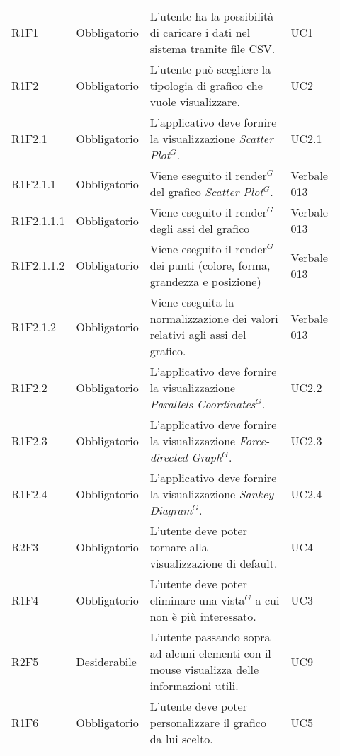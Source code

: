 {\begin{longtable}{p{0.12\linewidth}p{0.15\linewidth}p{0.50\linewidth}p{0.15\linewidth}}
    \rowcolor[RGB]{216, 235, 171}
    R1F1 & Obbligatorio & L'utente ha la possibilità di caricare i dati nel sistema tramite file CSV. & UC1\\
    \rowcolor[RGB]{233, 245, 206}
    R1F2 & Obbligatorio & L'utente può scegliere la tipologia di grafico che vuole visualizzare. & UC2\\
    \rowcolor[RGB]{216, 235, 171}
    R1F2.1 & Obbligatorio & L'applicativo deve fornire la visualizzazione \textit{Scatter Plot$^{G}$}. & UC2.1\\
    \rowcolor[RGB]{233, 245, 206}
    R1F2.1.1 & Obbligatorio & Viene eseguito il render$^{G}$ del grafico \textit{Scatter Plot$^{G}$}. & Verbale 013\\
    \rowcolor[RGB]{216, 235, 171}
    R1F2.1.1.1 & Obbligatorio & Viene eseguito il render$^{G}$ degli assi del grafico & Verbale 013\\
    \rowcolor[RGB]{233, 245, 206}
    R1F2.1.1.2 & Obbligatorio & Viene eseguito il render$^{G}$ dei punti (colore, forma, grandezza e posizione)& Verbale 013\\
    \rowcolor[RGB]{216, 235, 171}
    R1F2.1.2 & Obbligatorio & Viene eseguita la normalizzazione dei valori relativi agli assi del grafico. & Verbale 013\\
    \rowcolor[RGB]{233, 245, 206}
    R1F2.2 & Obbligatorio & L'applicativo deve fornire la visualizzazione \textit{Parallels Coordinates$^{G}$}. & UC2.2\\
    \rowcolor[RGB]{216, 235, 171}
    R1F2.3 & Obbligatorio & L'applicativo deve fornire la visualizzazione \textit{Force-directed Graph$^{G}$}. & UC2.3\\
    \rowcolor[RGB]{233, 245, 206}
    R1F2.4 & Obbligatorio & L'applicativo deve fornire la visualizzazione \textit{Sankey Diagram$^{G}$}. & UC2.4\\
    \rowcolor[RGB]{216, 235, 171}
    R2F3 & Obbligatorio & L'utente deve poter tornare alla visualizzazione di default. & UC4\\
    \rowcolor[RGB]{233, 245, 206}
    R1F4 & Obbligatorio & L'utente deve poter eliminare una vista$^{G}$ a cui non è più interessato. & UC3\\
    \rowcolor[RGB]{216, 235, 171}
    R2F5 & Desiderabile & L'utente passando sopra ad alcuni elementi con il mouse visualizza delle informazioni utili. & UC9\\
    \rowcolor[RGB]{233, 245, 206}
    R1F6 & Obbligatorio & L'utente deve poter personalizzare il grafico da lui scelto. & UC5\\

\end{longtable}}
